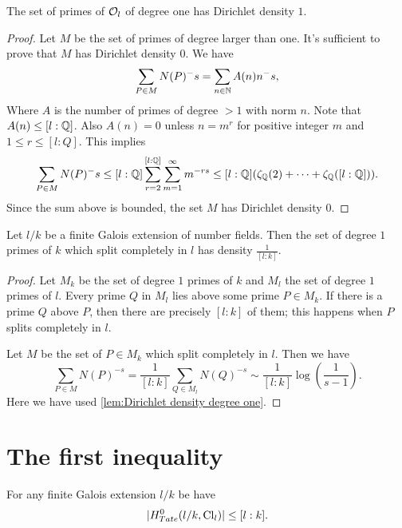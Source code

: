 \begin{lemma} \label{lem:Dirichlet density degree one}
	The set of primes of ${\mathcal O}_l$ of degree one has Dirichlet density $1$.
\end{lemma}

\begin{proof}
	Let $M$ be the set of primes of degree larger than one. It's sufficient to
	prove that $M$ has Dirichlet density $0$.
	We have
	\[
		\sum_{P \in M} N(P)^-s
		= \sum_{n \in {\mathbb N}} A(n) n^-s,
	\]
	Where $A$ is the number of primes of degree $>1$ with norm $n$.
	Note that $A(n) \le [l:{\mathbb Q}]$. Also $A(n)=0$ unless $n=m^r$ for positive integer $m$ and
	$1 \le r \le [l:Q]$.
	This implies
	\[
		\sum_{P \in M} N(P)^-s
		\le [l:{\mathbb Q}] \sum_{r=2}^{[l:{\mathbb Q}]} \sum_{m =1} ^\infty m^{-rs}
		\le [l:{\mathbb Q}] (\zeta_{\mathbb Q}(2) + \cdots + \zeta_{\mathbb Q}([l:{\mathbb Q}]) ).
	\]
	Since the sum above is bounded, the set $M$ has Dirichlet density $0$.
\end{proof}


\begin{lemma} \label{lem:Dirichlet density split}
	Let $l/k$ be a finite Galois extension of number fields.
	Then the set of degree $1$ primes of $k$ which split completely in $l$
	has density $\frac{1}{[l:k]}$.
\end{lemma}

\begin{proof}
	Let $M_k$ be the set of degree $1$ primes of $k$ and $M_l$ the set of degree $1$ primes of $l$.
	Every prime $Q$ in $M_l$ lies above some prime $P \in M_k$.
	If there is a prime $Q$ above $P$, then there are precisely $[l:k]$ of them; this happens when $P$
	splits completely in $l$.

	Let $M$ be the set of $P \in M_k$ which split completely in $l$.
	Then we have
	\[
		\sum_{P \in M} N(P)^{-s}
		=
		\frac{1}{[l:k]} \sum_{Q \in M_l} N(Q)^{-s}
		\sim \frac{1}{[l:k]} \log\left( \frac{1}{s-1}\right).
	\]
	Here we have used \ref{lem:Dirichlet density degree one}.
\end{proof}





\section{The first inequality}

\begin{theorem} \label{thm:first inequality}
	For any finite Galois extension $l/k$ be have
	\[
		|H^0_{Tate}(l/k, \mathrm{Cl}_{l}) | \le [l : k].
	\]
\end{theorem}

